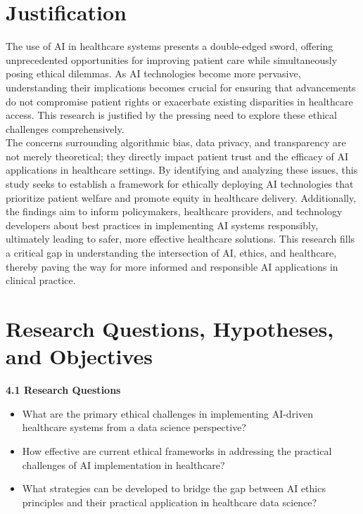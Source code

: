 \documentclass[a4paper, 12pt]{article}
\begin{document}
\section{Justification} The use of AI in healthcare systems presents a double-edged sword, offering unprecedented opportunities for improving patient care while simultaneously posing ethical dilemmas. As AI technologies become more pervasive, understanding their implications becomes crucial for ensuring that advancements do not compromise patient rights or exacerbate existing disparities in healthcare access. This research is justified by the pressing need to explore these ethical challenges comprehensively.\\

The concerns surrounding algorithmic bias, data privacy, and transparency are not merely theoretical; they directly impact patient trust and the efficacy of AI applications in healthcare settings. By identifying and analyzing these issues, this study seeks to establish a framework for ethically deploying AI technologies that prioritize patient welfare and promote equity in healthcare delivery. Additionally, the findings aim to inform policymakers, healthcare providers, and technology developers about best practices in implementing AI systems responsibly, ultimately leading to safer, more effective healthcare solutions. This research fills a critical gap in understanding the intersection of AI, ethics, and healthcare, thereby paving the way for more informed and responsible AI applications in clinical practice.

\section{Research Questions, Hypotheses, and Objectives}

\textbf{\large 4.1 \hspace{5mm} Research Questions}
\begin{itemize}
\item What are the primary ethical challenges in implementing AI-driven healthcare systems from a data science perspective?

\item How effective are current ethical frameworks in addressing the practical challenges of AI implementation in healthcare?

\item What strategies can be developed to bridge the gap between AI ethics principles and their practical application in healthcare data science?
\end{itemize}
\end{document}
